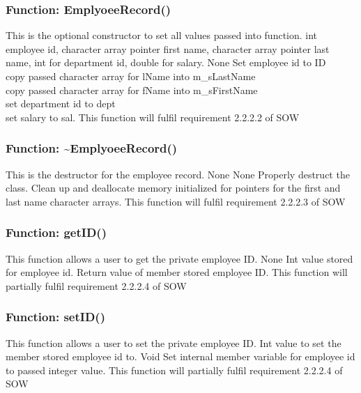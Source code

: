 \documentclass[12pt]{article}%
\newcounter{subsubsubsection}[subsubsection]
\begin{document}
\subsubsection{Function: EmplyoeeRecord()}
This is the optional constructor to set all values passed into function.
int employee id, character array pointer first name, character array pointer last name, int for
department id, double for salary.
None
Set employee id to ID\\
copy passed character array for lName into m\_sLastName\\
copy passed character array for fName into m\_sFirstName\\
set department id to dept\\
set salary to sal.
This function will fulfil requirement 2.2.2.2 of SOW

\subsubsection{Function: \textasciitilde EmplyoeeRecord()}
This is the destructor for the employee record.
None
None
Properly destruct the class. Clean up and deallocate memory initialized for pointers for the first and last name
character arrays.
This function will fulfil requirement 2.2.2.3 of SOW

\subsubsection{Function:  getID()}
This function allows a user to get the private employee ID.
None
Int value stored for employee id.
Return value of member stored employee ID.
This function will partially fulfil requirement 2.2.2.4 of SOW

\subsubsection{Function:  setID()}
This function allows a user to set the private employee ID.
Int value to set the member stored employee id to.
Void
Set internal member variable for employee id to passed integer value.
This function will partially fulfil requirement 2.2.2.4 of SOW
\end{document}
